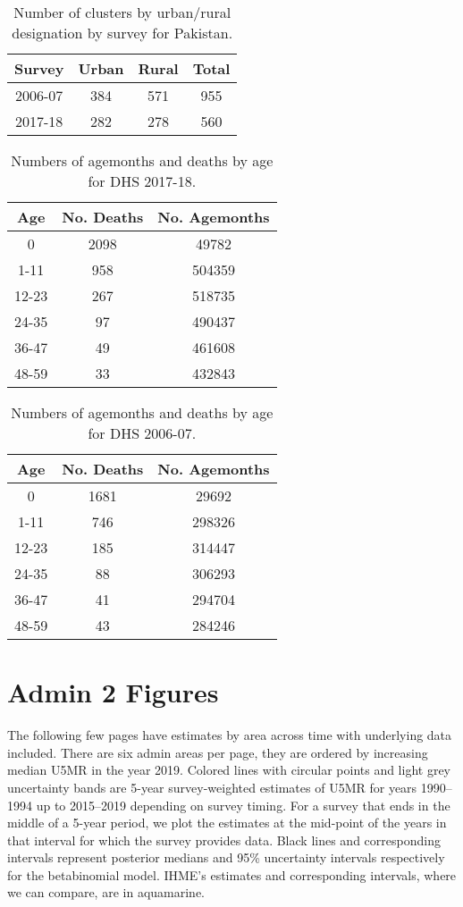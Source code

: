 \documentclass[]{article}
\begin{document}
\begin{table}[ht]
\centering
\begin{tabular}{cccc}
  \hline
Survey & Urban & Rural & Total \\ 
  \hline
2006-07 & 384 & 571 & 955 \\ 
  2017-18 & 282 & 278 & 560 \\ 
   \hline
\end{tabular}
\caption{Number of clusters by urban/rural designation by survey for Pakistan.} 
\end{table}
\begin{table}[!ht]
\centering
\begin{tabular}{ccc}
  \hline
Age & No. Deaths & No. Agemonths \\ 
  \hline
0 & 2098 & 49782 \\ 
  1-11 & 958 & 504359 \\ 
  12-23 & 267 & 518735 \\ 
  24-35 & 97 & 490437 \\ 
  36-47 & 49 & 461608 \\ 
  48-59 & 33 & 432843 \\ 
   \hline
\end{tabular}
\caption{Numbers of agemonths and deaths by age for DHS 2017-18.} 
\end{table}
\begin{table}[!ht]
\centering
\begin{tabular}{ccc}
  \hline
Age & No. Deaths & No. Agemonths \\ 
  \hline
0 & 1681 & 29692 \\ 
  1-11 & 746 & 298326 \\ 
  12-23 & 185 & 314447 \\ 
  24-35 & 88 & 306293 \\ 
  36-47 & 41 & 294704 \\ 
  48-59 & 43 & 284246 \\ 
   \hline
\end{tabular}
\caption{Numbers of agemonths and deaths by age for DHS 2006-07.} 
\end{table}

\clearpage

\hypertarget{admin-2-figures}{%
\section{Admin 2 Figures}\label{admin-2-figures}}

The following few pages have estimates by area across time with
underlying data included. There are six admin areas per page, they are
ordered by increasing median U5MR in the year 2019. Colored lines with
circular points and light grey uncertainty bands are 5-year
survey-weighted estimates of U5MR for years 1990--1994 up to 2015--2019
depending on survey timing. For a survey that ends in the middle of a
5-year period, we plot the estimates at the mid-point of the years in
that interval for which the survey provides data. Black lines and
corresponding intervals represent posterior medians and 95\% uncertainty
intervals respectively for the betabinomial model. IHME's estimates and
corresponding intervals, where we can compare, are in aquamarine.
\end{document}
